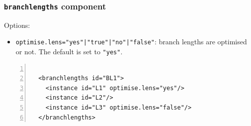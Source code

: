 \documentclass[a4paper,12pt]{article}
\newcommand{\x}[1]{\texttt{#1}}
\begin{document}
\subsubsection{{\tt branchlengths} component}
Options:
\begin{itemize}
\item \x{optimise.lens="yes"|"true"|"no"|"false"}: branch lengths are optimised or not. The default
  is set to \x{"yes"}.
\end{itemize}
\vspace{0.2cm}
\begin{Verbatim}[frame=single, label=Example of `branchlengths' component, baselinestretch=0.5,
  fontsize=\small, numbers=left]

  <branchlengths id="BL1">
    <instance id="L1" optimise.lens="yes"/>
    <instance id="L2"/>
    <instance id="L3" optimise.lens="false"/>
  </branchlengths>

\end{Verbatim}
\end{document}
